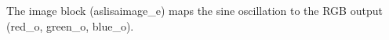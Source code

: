 The image block (aslisaimage\_e) maps the sine oscillation to the RGB output (red\_o, green\_o, blue\_o).

